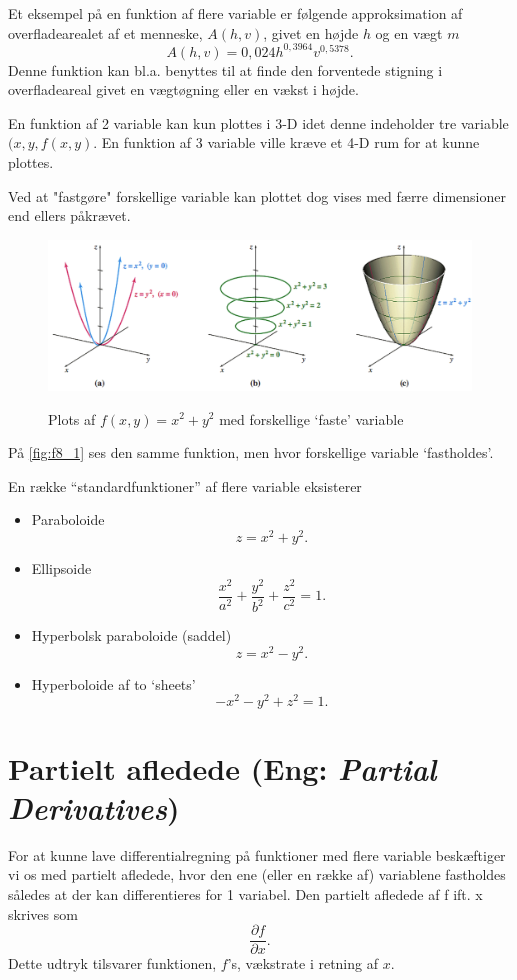 \begin{eks}
  Et eksempel på en funktion af flere variable er følgende approksimation af overfladearealet af et menneske, $A(h, v)$, givet en højde $h$ og en vægt $m$
  \[
  A(h,v) = 0,024h^{0,3964}v^{0,5378}
  .\]
  Denne funktion kan bl.a. benyttes til at finde den forventede stigning i overfladeareal givet en vægtøgning eller en vækst i højde.
\end{eks}
En funktion af 2 variable kan kun plottes i 3-D idet denne indeholder tre variable $(x, y, f(x, y)$. En funktion af 3 variable ville kræve et 4-D rum for at kunne plottes.

Ved at "fastgøre" forskellige variable kan plottet dog vises med færre dimensioner end ellers påkrævet. 

\begin{figure} [ht]
  \centering
  \caption{Plots af $f(x,y) = x^2 + y^2$ med forskellige `faste' variable}
  \includegraphics[width=0.8\linewidth]{./figures/f8_1.png}
  \label{fig:f8_1}
\end{figure}

På \autoref{fig:f8_1} ses den samme funktion, men hvor forskellige variable `fastholdes'.

En række ``standardfunktioner'' af flere variable eksisterer
\begin{itemize}
  \item Paraboloide
    \[ 
    z = x^2 + y^2
    .\]
  \item Ellipsoide
    \[ 
    \frac{x^2}{a^2} + \frac{y^2}{b^2} + \frac{z^2}{c^2} = 1
    .\]
  \item Hyperbolsk paraboloide (saddel)
    \[ 
    z = x^2 - y^2
    .\]
  \item Hyperboloide af to `sheets' 
    \[ 
    -x^2-y^2+z^2 = 1
    .\]
\end{itemize}

\section{Partielt afledede (Eng: \textit{Partial Derivatives})}
For at kunne lave differentialregning på funktioner med flere variable beskæftiger vi os med partielt afledede, hvor den ene (eller en række af) variablene fastholdes således at der kan differentieres for 1 variabel. Den partielt afledede af f ift. x skrives som
\[ 
\frac{\partial f}{\partial x}
.\]
Dette udtryk tilsvarer funktionen, $f$'s, vækstrate i retning af $x$. 

